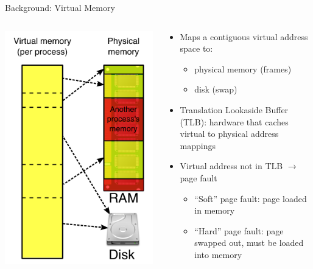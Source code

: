\documentclass[aspectratio=169]{beamer}
\newcommand{\bi}{\begin{itemize}}
\newcommand{\ei}{\end{itemize}}
\begin{document}
\begin{frame}{Background: Virtual Memory}
  \begin{columns}[T]
    \begin{column}{0.3\textwidth}
      \includegraphics[scale=0.2]{./figures/Virtual_memory.png}
    \end{column}
    \begin{column}{0.7\textwidth}
      \bi
    \item Maps a contiguous virtual address space to:
      \bi
    \item physical memory (frames)
    \item disk (swap)
      \ei
    \item Translation Lookaside Buffer (TLB): hardware that caches virtual to physical address mappings
    \item Virtual address not in TLB $\rightarrow$ page fault
      \bi
    \item ``Soft'' page fault: page loaded in memory
    \item ``Hard'' page fault: page swapped out, must be loaded into memory
      \ei
      \ei
    \end{column}
  \end{columns}
\end{frame}
\end{document}
